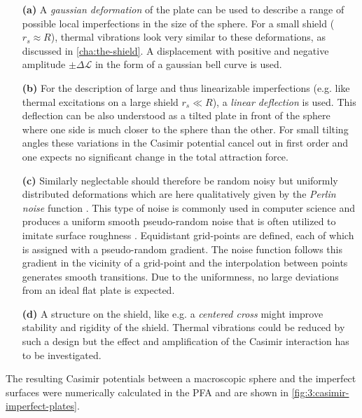 \begin{enumerate}
  \item[\textbf{(a)}] A \textit{gaussian deformation} of the plate can be used to describe a range of possible local imperfections in the size of the sphere. 
  For a small shield ($r_s \approx R$), thermal vibrations look very similar to these deformations, as discussed in \cref{cha:the-shield}.
  A displacement with positive and negative amplitude $\pm \Delta \mathscr{L}$ in the form of a gaussian bell curve is used.

  \item[\textbf{(b)}] For the description of large and thus linearizable imperfections (e.g. like thermal excitations on a large shield $r_s \ll R$), a \textit{linear deflection} is used. This deflection can be also understood as a tilted plate in front of the sphere where one side is much closer to the sphere than the other. For small tilting angles these variations in the Casimir potential cancel out in first order and one expects no significant change in the total attraction force.
  
  \item[\textbf{(c)}] Similarly neglectable should therefore be random noisy but uniformly distributed deformations which are here qualitatively given by the \textit{Perlin noise} function \cite{Perlin_1985}. This type of noise is commonly used in computer science and produces a uniform smooth pseudo-random noise that is often utilized to imitate surface roughness \cite{Perlin_1985}. Equidistant grid-points are defined, each of which is assigned with a pseudo-random gradient. The noise function follows this gradient in the vicinity of a grid-point and the interpolation between points generates smooth transitions. Due to the uniformness, no large deviations from an ideal flat plate is expected.
  
  \item[\textbf{(d)}] A structure on the shield, like e.g. a \textit{centered cross} might improve stability and rigidity of the shield. Thermal vibrations could be reduced by such a design but the effect and amplification of the Casimir interaction has to be investigated.
\end{enumerate}
The resulting Casimir potentials between a macroscopic sphere and the imperfect surfaces were numerically calculated in the PFA and are shown in \cref{fig:3:casimir-imperfect-plates}.
